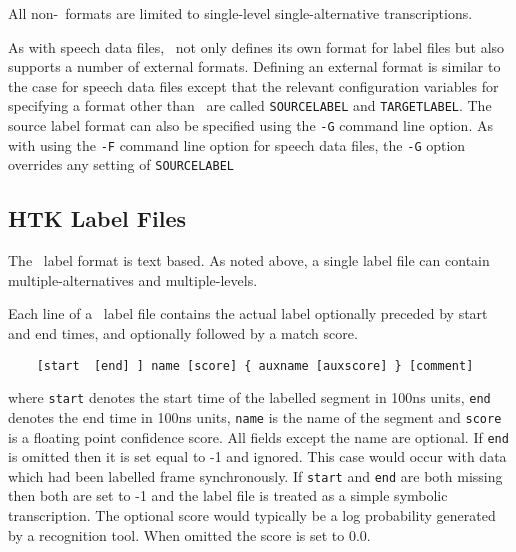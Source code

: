 All non-\HTK\ formats are limited to
single-level single-alternative transcriptions.



As with speech data files, \HTK\ not only defines its own format for
label files but also supports a number of external formats.  Defining
an external format is similar to the case for speech data files except
that the relevant configuration variables for specifying a format
other than \HTK\ are called \texttt{SOURCELABEL} and \texttt{TARGETLABEL}.
The source label format can also be specified using the 
\texttt{-G} command
line option.  As with using the 
\texttt{-F} command
line option for speech data files, the \texttt{-G} option overrides any
setting of \texttt{SOURCELABEL}

\subsection{HTK Label Files}

The \HTK\ label format is text based.  As noted above, a single label
file can contain multiple-alternatives and multiple-levels.

Each line of a \HTK\ label file contains
the actual label optionally preceded by start and end times, and
optionally followed by a match score.  
\begin{verbatim}
    [start  [end] ] name [score] { auxname [auxscore] } [comment]
\end{verbatim}
where \texttt{start} denotes the start time of the labelled segment
in 100ns units, \texttt{end}
denotes the end time in 100ns units,  \texttt{name} is the name
of the segment and \texttt{score} is a floating point confidence score.
All fields except the name are optional.  If \texttt{end} is omitted then
it is set equal to -1 and ignored.  This case would occur with data which had
been labelled frame synchronously.  If \texttt{start} and \texttt{end} are both
missing then both are set to -1 and the label file is treated as a 
simple symbolic transcription.  The
optional score would typically be a log probability generated by a 
recognition tool.  When omitted the score is set to 0.0.


